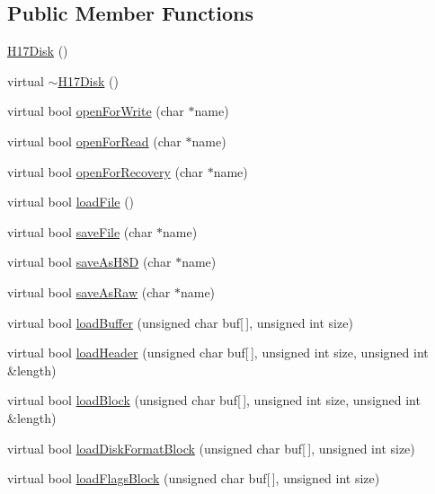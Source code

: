 \subsection*{Public Member Functions}
\begin{DoxyCompactItemize}
\item 
\hyperlink{classH17Disk_af65aae49c99d4be95b6493b696dbc758}{H17\+Disk} ()
\item 
virtual \hyperlink{classH17Disk_af2d62014dd9e0cdf5604845e1d1f381c}{$\sim$\+H17\+Disk} ()
\item 
virtual bool \hyperlink{classH17Disk_ad29344c720e1a09c4de310d51ce40449}{open\+For\+Write} (char $\ast$name)
\item 
virtual bool \hyperlink{classH17Disk_a2d9e6faca3284d426af174b18554d4a9}{open\+For\+Read} (char $\ast$name)
\item 
virtual bool \hyperlink{classH17Disk_aa375761378f8a80cb8c5e479008c0e32}{open\+For\+Recovery} (char $\ast$name)
\item 
virtual bool \hyperlink{classH17Disk_a8e41c133b13e5c9c2c8f1d39b73d5292}{load\+File} ()
\item 
virtual bool \hyperlink{classH17Disk_adfb88c5c9f3c67a0923a4d24e5efe791}{save\+File} (char $\ast$name)
\item 
virtual bool \hyperlink{classH17Disk_a92edc41852a329daed3e91f50e0271c7}{save\+As\+H8\+D} (char $\ast$name)
\item 
virtual bool \hyperlink{classH17Disk_a0a7412197ca1478393a45885cc132916}{save\+As\+Raw} (char $\ast$name)
\item 
virtual bool \hyperlink{classH17Disk_a0741de759498d3ba29f4bdef4e943590}{load\+Buffer} (unsigned char buf\mbox{[}$\,$\mbox{]}, unsigned int size)
\item 
virtual bool \hyperlink{classH17Disk_a96fe20794510f9235881fd62497f598f}{load\+Header} (unsigned char buf\mbox{[}$\,$\mbox{]}, unsigned int size, unsigned int \&length)
\item 
virtual bool \hyperlink{classH17Disk_ab5299643ce037fb442e0ccb21cb80c5f}{load\+Block} (unsigned char buf\mbox{[}$\,$\mbox{]}, unsigned int size, unsigned int \&length)
\item 
virtual bool \hyperlink{classH17Disk_a4c484465d1c422d5ce5b4661bc72dd3a}{load\+Disk\+Format\+Block} (unsigned char buf\mbox{[}$\,$\mbox{]}, unsigned int size)
\item 
virtual bool \hyperlink{classH17Disk_a8dfa864cc65f81413d3b518c6c1e67e6}{load\+Flags\+Block} (unsigned char buf\mbox{[}$\,$\mbox{]}, unsigned int size)

\end{DoxyCompactItemize}
